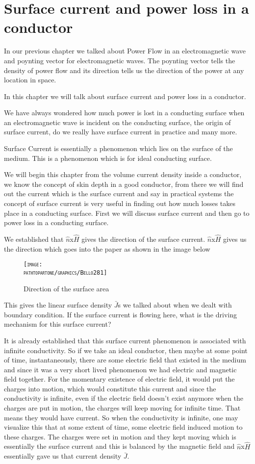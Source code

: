 \chapter{Surface current and power loss in a conductor}\label{lec:lec28}
In our previous chapter we talked about Power Flow in an electromagnetic wave and poynting vector for electromagnetic waves. The poynting vector tells the density of power flow and its direction tells us the direction of the power at any location in space.

In this chapter we will talk about surface current and power loss in a conductor.

We have always wondered how much power is lost in a conducting surface when an electromagnetic wave is incident on the conducting surface, the origin of surface current, do we really have surface current in practice and many more.

Surface Current is essentially a phenomenon which lies on the surface of the medium. This is a phenomenon which is for ideal conducting surface.

We will begin this chapter from the volume current density inside a conductor, we know the concept of skin depth in a good conductor, from there we will find out the current which is the surface current and say in practical systems the concept of surface current is very useful in finding out how much losses takes place in a conducting surface. First we will discuss surface current and then go to power loss in a conducting surface.

We established that $\hat{n}$x$\hat{H}$ gives the direction of the surface current. $\hat{n}$x$\hat{H}$ gives us the direction which goes into the paper as shown in the image below
\begin{figure}[h]
\centering
\textsc{\texttt{[image: \\pathtopartone/graphics/Bello281]}}
\caption{Direction of the surface area }
\end{figure}

This gives the linear surface density $\bar{J}$s we talked about when we dealt with boundary condition. If the surface current is flowing here, what is the driving mechanism for this surface current?

It is already established that this surface current phenomenon is associated with infinite conductivity. So if we take an ideal conductor, then maybe at some point of time, instantaneously, there are some electric field that existed in the medium and since it was a very short lived phenomenon we had electric and magnetic field together.
For the momentary existence of electric field, it would put the charges into motion, which would constitute this current and since the conductivity is infinite, even if the electric field doesn't exist anymore when the charges are put in motion, the charges will keep moving for infinite time. That means they would have current. So when the conductivity is infinite, one may visualize this that at some extent of time, some electric field induced motion to these charges. The charges were set in motion and they kept moving which is essentially the surface current and this is balanced by the magnetic field and $\hat{n}$x$\hat{H}$ essentially gave us that current density $\bar{J}$.

